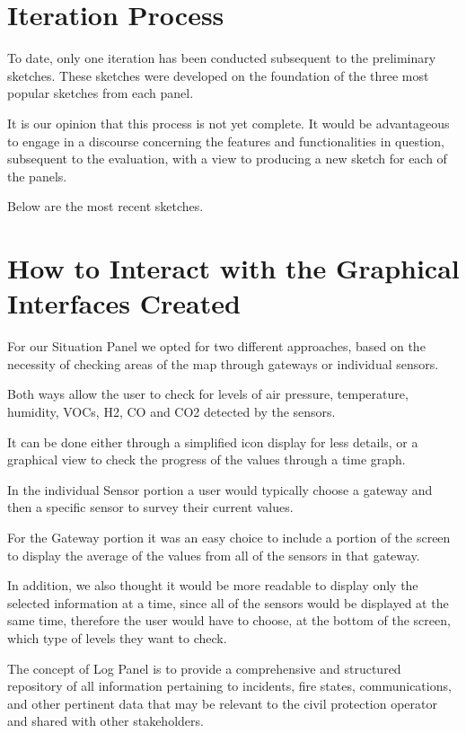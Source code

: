 \section{Iteration Process}
To date, only one iteration has been conducted subsequent to the preliminary sketches. These sketches were developed on the foundation of the three most popular sketches from each panel. \par
It is our opinion that this process is not yet complete. It would be advantageous to engage in a discourse concerning the features and functionalities in question, subsequent to the evaluation, with a view to producing a new sketch for each of the panels. \par
Below are the most recent sketches. \par

\section{How to Interact with the Graphical Interfaces Created}
For our Situation Panel we opted for two different approaches, based on the necessity of checking areas of the map through gateways or individual sensors. \par
Both ways allow the user to check for levels of air pressure, temperature, humidity, VOCs, H2, CO and CO2 detected by the sensors. \par
It can be done either through a simplified icon display for less details, or a graphical view to check the progress of the values through a time graph. \par
In the individual Sensor portion a user would typically choose a gateway and then a specific sensor to survey their current values. \par
For the Gateway portion it was an easy choice to include a portion of the screen to display the average of the values from all of the sensors in that gateway. \par
In addition, we also thought it would be more readable to display only the selected information at a time, since all of the sensors would be displayed at the same time, therefore the user would have to choose, at the bottom of the screen, which type of levels they want to check. \par
The concept of Log Panel is to provide a comprehensive and structured repository of all information pertaining to incidents, fire states, communications, and other pertinent data that may be relevant to the civil protection operator and shared with other stakeholders.
